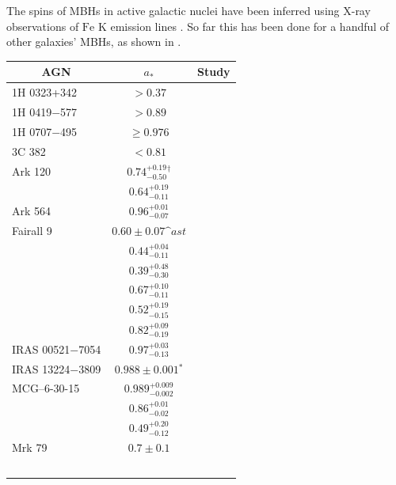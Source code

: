 The spins of MBHs in active galactic nuclei have been inferred using X-ray observations of $\mathrm{Fe}$ $\mathrm{K}$ emission lines \citep{Miller2007, McClintock2011}. So far this has been done for a handful of other galaxies' MBHs, as shown in .
\begin{table}[htp]
\centering
\begin{tabular}{l c l }
\toprule
\multicolumn{1}{c}{AGN} & \multicolumn{1}{c}{$a_\ast$} & \multicolumn{1}{c}{Study} \\ \midrule 
1H 0323+342 & $>0.37$ & \citet{Walton2013} \\ %
1H 0419$-$577 & $>0.89$ & \citet{Walton2013} \\ %
1H 0707$-$495 & $\geq 0.976$ & \citet{Zoghbi2010} \\ %
3C 382	& $<0.81$ & \citet{Walton2013} \\ %
Ark 120 & $0.74^{+0.19}_{-0.50}$$^\dagger$ & \citet{Nardini2011} \\ %
 & $0.64^{+0.19}_{-0.11}$ & \citet{Walton2013} \\ %
Ark 564 & $0.96^{+0.01}_{-0.07}$ & \citet{Walton2013} \\ %
Fairall 9 & $0.60 \pm 0.07$$\^ast$ & \citet{Schmoll2009} \\ %
 & $0.44^{+0.04}_{-0.11}$ & \citet{Patrick2011} \\ %
 & $0.39^{+0.48}_{-0.30}$ & \citet{Emmanoulopoulos2011} \\ %
 & $0.67^{+0.10}_{-0.11}$ & \citet{Patrick2011a} \\ %
 & $0.52^{+0.19}_{-0.15}$ & \citet{Lohfink2012} \\ %
 & $0.82^{+0.09}_{-0.19}$ & \citet{Walton2013} \\ %
IRAS 00521$-$7054 & $0.97^{+0.03}_{-0.13}$ & \citet{Tan2012} \\ %
IRAS 13224$-$3809 & $0.988 \pm 0.001$$^\ast$ & \citet{Fabian2013} \\ %
MCG--6-30-15 & $0.989^{+0.009}_{-0.002}$ & \citet{Brenneman2006} \\ %
 & $0.86^{+0.01}_{-0.02}$ & \citet{delaCallePerez2010} \\ %
 & $0.49^{+0.20}_{-0.12}$ & \citet{Patrick2011a} \\ %
Mrk 79 & $0.7 \pm 0.1$ & \citet{Gallo2011} \\ %
$$
\end{tabular}
\end{table}
